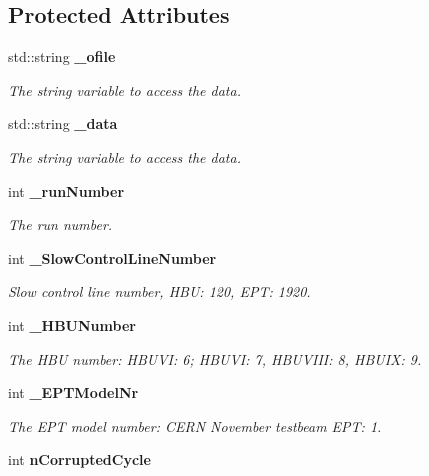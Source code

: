 \subsection*{Protected Attributes}
\begin{DoxyCompactItemize}
\item 
std\-::string {\bf \-\_\-ofile}
\begin{DoxyCompactList}\small\item\em The string variable to access the data. \end{DoxyCompactList}\item 
std\-::string {\bf \-\_\-data}\label{classmarlin_1_1LabviewConverter2_a5256b6a520932eda9430b64bdc57d983}

\begin{DoxyCompactList}\small\item\em The string variable to access the data. \end{DoxyCompactList}\item 
int {\bf \-\_\-run\-Number}\label{classmarlin_1_1LabviewConverter2_a296e5632f4f412b507918e716198644a}

\begin{DoxyCompactList}\small\item\em The run number. \end{DoxyCompactList}\item 
int {\bf \-\_\-\-Slow\-Control\-Line\-Number}\label{classmarlin_1_1LabviewConverter2_ad4d497210ab5766096e996e31c6d4230}

\begin{DoxyCompactList}\small\item\em Slow control line number, H\-B\-U\-: 120, E\-P\-T\-: 1920. \end{DoxyCompactList}\item 
int {\bf \-\_\-\-H\-B\-U\-Number}
\begin{DoxyCompactList}\small\item\em The H\-B\-U number\-: H\-B\-U\-V\-I\-: 6; H\-B\-U\-V\-I\-: 7, H\-B\-U\-V\-I\-I\-I\-: 8, H\-B\-U\-I\-X\-: 9. \end{DoxyCompactList}\item 
int {\bf \-\_\-\-E\-P\-T\-Model\-Nr}\label{classmarlin_1_1LabviewConverter2_acb3e4506ca6a43017cfa26efa5170b99}

\begin{DoxyCompactList}\small\item\em The E\-P\-T model number\-: C\-E\-R\-N November testbeam E\-P\-T\-: 1. \end{DoxyCompactList}\item 
int {\bf n\-Corrupted\-Cycle}\label{classmarlin_1_1LabviewConverter2_a51f65918a12c7a77d03eba15a7d049cd}


\end{DoxyCompactItemize}
